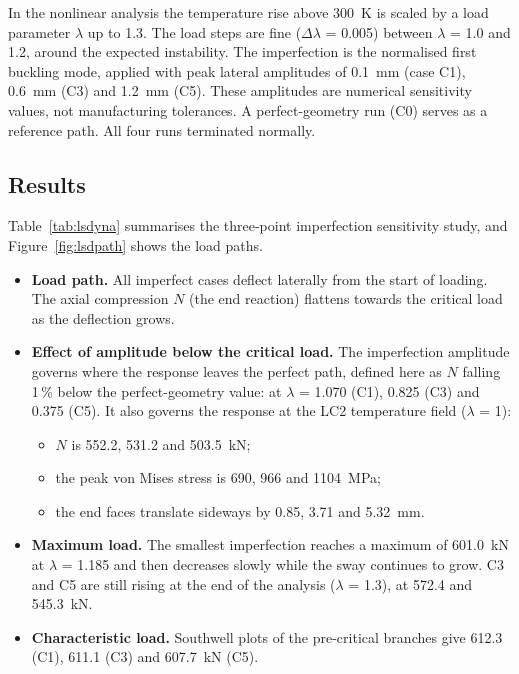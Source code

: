 In the nonlinear analysis the temperature rise above 300~K is scaled by a load parameter $\lambda$ up to 1.3. The load steps are fine
($\Delta\lambda$ = 0.005) between $\lambda$ = 1.0 and 1.2, around the expected instability. The imperfection is the normalised first buckling
mode, applied with peak lateral amplitudes of 0.1~mm (case C1), 0.6~mm (C3) and 1.2~mm (C5). These amplitudes are numerical sensitivity
values, not manufacturing tolerances. A perfect-geometry run (C0) serves as a reference path. All four runs terminated normally.

\subsection{Results}
Table~\ref{tab:lsdyna} summarises the three-point imperfection sensitivity study, and Figure~\ref{fig:lsdpath} shows the load paths.

\begin{itemize}
\item \textbf{Load path.} All imperfect cases deflect laterally from the start of loading. The axial compression $N$ (the end reaction)
      flattens towards the critical load as the deflection grows.
\item \textbf{Effect of amplitude below the critical load.} The imperfection amplitude governs where the response leaves the perfect path,
      defined here as $N$ falling 1\,\% below the perfect-geometry value: at $\lambda$ = 1.070 (C1), 0.825 (C3) and 0.375 (C5). It also governs
      the response at the LC2 temperature field ($\lambda$ = 1):
      \begin{itemize}
      \item $N$ is 552.2, 531.2 and 503.5~kN;
      \item the peak von Mises stress is 690, 966 and 1104~MPa;
      \item the end faces translate sideways by 0.85, 3.71 and 5.32~mm.
      \end{itemize}
\item \textbf{Maximum load.} The smallest imperfection reaches a maximum of 601.0~kN at $\lambda$ = 1.185 and then decreases slowly while the
      sway continues to grow. C3 and C5 are still rising at the end of the analysis ($\lambda$ = 1.3), at 572.4 and 545.3~kN.
\item \textbf{Characteristic load.} Southwell plots of the pre-critical branches give 612.3 (C1), 611.1 (C3) and 607.7~kN (C5).
\end{itemize}

